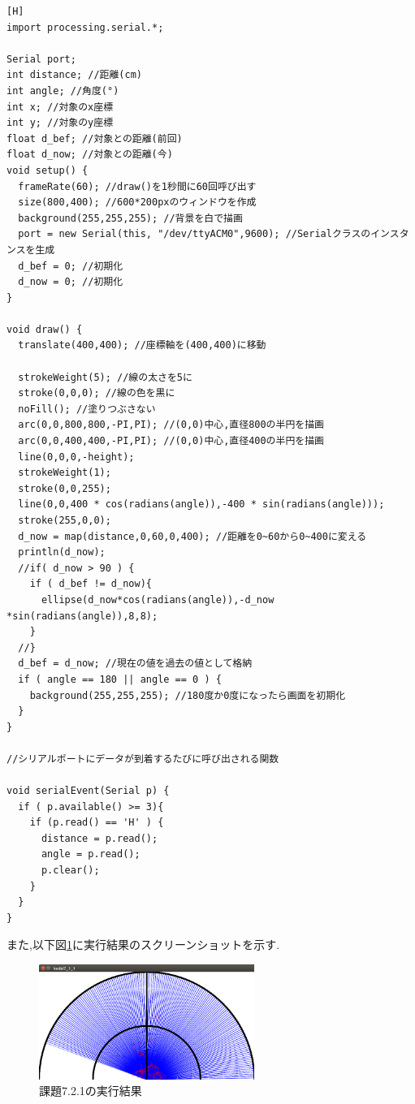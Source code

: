 \documentclass{jarticle}
\begin{document}
\begin{lstlisting}[caption = 課題7.2.1(Processing),label=code:kadai7-2-1-p][H]
import processing.serial.*;

Serial port;
int distance; //距離(cm)
int angle; //角度(°)
int x; //対象のx座標
int y; //対象のy座標
float d_bef; //対象との距離(前回)
float d_now; //対象との距離(今)
void setup() {
  frameRate(60); //draw()を1秒間に60回呼び出す
  size(800,400); //600*200pxのウィンドウを作成
  background(255,255,255); //背景を白で描画
  port = new Serial(this, "/dev/ttyACM0",9600); //Serialクラスのインスタンスを生成
  d_bef = 0; //初期化
  d_now = 0; //初期化
}

void draw() {
  translate(400,400); //座標軸を(400,400)に移動
  
  strokeWeight(5); //線の太さを5に
  stroke(0,0,0); //線の色を黒に
  noFill(); //塗りつぶさない
  arc(0,0,800,800,-PI,PI); //(0,0)中心,直径800の半円を描画
  arc(0,0,400,400,-PI,PI); //(0,0)中心,直径400の半円を描画
  line(0,0,0,-height);
  strokeWeight(1);
  stroke(0,0,255);
  line(0,0,400 * cos(radians(angle)),-400 * sin(radians(angle)));
  stroke(255,0,0);
  d_now = map(distance,0,60,0,400); //距離を0~60から0~400に変える
  println(d_now);
  //if( d_now > 90 ) {
    if ( d_bef != d_now){
      ellipse(d_now*cos(radians(angle)),-d_now *sin(radians(angle)),8,8);
    }
  //}
  d_bef = d_now; //現在の値を過去の値として格納
  if ( angle == 180 || angle == 0 ) {
    background(255,255,255); //180度か0度になったら画面を初期化
  }
}

//シリアルポートにデータが到着するたびに呼び出される関数

void serialEvent(Serial p) {
  if ( p.available() >= 3){
    if (p.read() == 'H' ) {
      distance = p.read();
      angle = p.read();
      p.clear();
    }
  }
}
\end{lstlisting}

また,以下図\ref{fig:kadai7-2-1}に実行結果のスクリーンショットを示す.

\begin{figure}[H]
\begin{center}
\includegraphics[width=7.0cm]{images/kadai7-2-1-yoi.png}
\caption{課題7.2.1の実行結果}
\label{fig:kadai7-2-1}
\end{center}
\end{figure}
\end{document}
